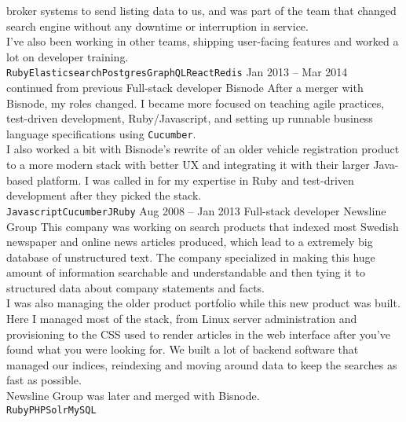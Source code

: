 \documentclass[9pt]{template} %
\begin{document}
\begin{entrylist}
{      broker systems to send listing data to us, and was part of the team that
      changed search engine without any downtime or interruption in service.\\
      I've also been working in other teams, shipping user-facing features and
      worked a lot on developer training.\\
      \texttt{Ruby}\slashsep\texttt{Elasticsearch}\slashsep\texttt{Postgres}\slashsep\texttt{GraphQL}\slashsep\texttt{React}\slashsep\texttt{Redis}}
  \entry
    {Jan 2013 -- Mar 2014\\\footnotesize{continued from previous}}
    {Full-stack developer}
    {Bisnode}
    {After a merger with Bisnode, my roles changed. I became more focused on
      teaching agile practices, test-driven development, Ruby/Javascript, and
      setting up runnable business language specifications using
      \texttt{Cucumber}.\\ I also worked a bit with Bisnode's rewrite of an
      older vehicle registration product to a more modern stack with better
      UX and integrating it with their larger Java-based platform. I was called
      in for my expertise in Ruby and test-driven development after they picked
      the stack.\\
      \texttt{Javascript}\slashsep\texttt{Cucumber}\slashsep\texttt{JRuby}}
  \entry
    {Aug 2008 -- Jan 2013}
    {Full-stack developer}
    {Newsline Group}
    {This company was working on search products that indexed most Swedish
      newspaper and online news articles produced, which lead to a extremely
      big database of unstructured text. The company specialized in making this
      huge amount of information searchable and understandable and then tying
      it to structured data about company statements and facts.\\ I was also
      managing the older product portfolio while this new product was built.\\
      Here I managed most of the stack, from Linux server administration and
      provisioning to the CSS used to render articles in the web interface
      after you've found what you were looking for. We built a lot of backend
      software that managed our indices, reindexing and moving around data to
      keep the searches as fast as possible.\\ Newsline Group was later and
      merged with Bisnode.\\
      \texttt{Ruby}\slashsep\texttt{PHP}\slashsep\texttt{Solr}\slashsep\texttt{MySQL}}
\end{entrylist}
\end{document}
